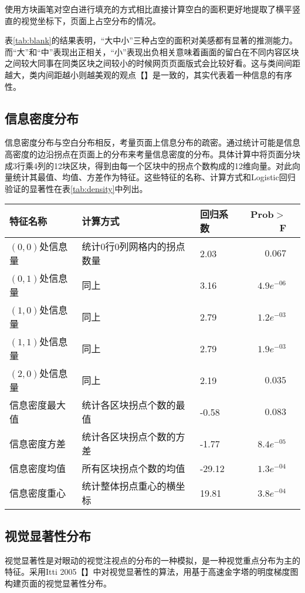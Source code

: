 使用方块画笔对空白进行填充的方式相比直接计算空白的面积更好地提取了横平竖直的视觉坐标下，页面上占空分布的情况。

表\ref{tab:blank}的结果表明，“大中小”三种占空的面积对美感都有显著的推测能力。而“大”和“中”表现出正相关，“小”表现出负相关意味着画面的留白在不同内容区块之间较大同事在同类区块之间较小的时候网页页面版式会比较好看。这与类间间距越大，类内间距越小则越美观的观点【】是一致的，其实代表着一种信息的有序性。

\subsection{信息密度分布}
信息密度分布与空白分布相反，考量页面上信息分布的疏密。通过统计可能是信息高密度的边沿拐点在页面上的分布来考量信息密度的分布。具体计算中将页面分块成3行乘4列的12块区块，得到由每一个区块中的拐点个数构成的12维向量。对此向量统计其最值、均值、方差作为特征。这些特征的名称、计算方式和Logistic回归验证的显著性在表\ref{tab:density}中列出。

\begin{table}[H]
  \centering
  \small
  \begin{tabular}{lllrr}
    \hline
     特征名称 & 计算方式 & 回归系数 & Prob$>$F \\
    \hline
    $(0, 0)$处信息量 & 统计0行0列网格内的拐点数量 & 2.03 & $0.067$\\
    $(0, 1)$处信息量 & 同上 & 3.16 & $4.9e^{-06}$\\
    $(1, 0)$处信息量 & 同上 & 2.79 & $1.2e^{-03}$\\
    $(1, 1)$处信息量 & 同上 & 2.79 & $1.9e^{-03}$\\
    $(2, 0)$处信息量 & 同上 & 2.19 & $0.035$\\
    信息密度最大值 & 统计各区块拐点个数的最值 & -0.58 & $0.083$\\
    信息密度方差 & 统计各区块拐点个数的方差 & -1.77 & $8.4e^{-05}$\\
    信息密度均值 & 所有区块拐点个数的均值 & -29.12 & $1.3e^{-04}$\\
    信息密度重心 & 统计整体拐点重心的横坐标 & 19.81 & $3.8e^{-04}$\\
    \hline
  \end{tabular}
\end{table}

\subsection{视觉显著性分布}
视觉显著性是对眼动的视觉注视点的分布的一种模拟，是一种视觉重点分布为主的特征。采用Itti 2005【】中对视觉显著性的算法，用基于高速金字塔的明度梯度图构建页面的视觉显著性分布。

